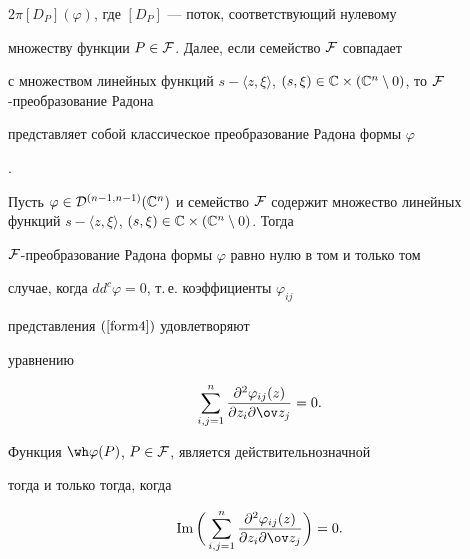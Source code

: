 $2\pi[D_P](\varphi)$, где $[D_P]$ --- поток, соответствующий нулевому 


множеству функции $P\in{\cal F} $. Далее, если семейство $\cal F$ совпадает 


с множеством линейных функций $s-\langle z, \xi \rangle$, $(s,\xi)\in\Bbb 


C\times(\Bbb C^n\setminus 0)$, то $\cal F$-преобразование Радона 


представляет собой классическое преобразование Радона формы $\varphi$ 


\cite{Gelf}. 





\begin{lem}\label{lemma1}


Пусть $\varphi\in{\cal D}^{(n-1,n-1)}(\Bbb 


C^n)$ и семейство $\cal F$ содержит множество линейных функций $s-\langle z, 


\xi \rangle$, $(s,\xi)\in\Bbb C\times(\Bbb C^n\setminus 0)$. Тогда 


$\cal F$-преобразование Радона формы $\varphi$ равно нулю в том и только том 


случае, когда $dd^c\varphi=0$, т.\,е. коэффициенты $\varphi_{ij}$ 


представления $(\ref{form4})$ удовлетворяют


уравнению


\begin{equation}\label{form6}


\sum\limits_{i,j=1}^n\frac{\partial^2\varphi_{ij}(z)}{\partial z_i\partial 


\ov z_j}=0.


\end{equation}





Функция $\wh\varphi(P)$, $P\in \cal F$, является действительнозначной


тогда и только тогда, когда


$$




\im\bigg(\sum\limits_{i,j=1}^n\frac{\partial^2\varphi_{ij}(z)}{\partial 


z_i\partial \ov z_j}\bigg)=0.




$$


\end{lem}





